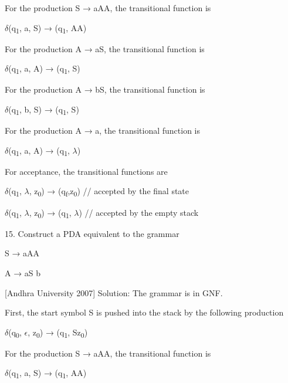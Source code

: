 \documentclass[]{article}
\begin{document}
For the production  S → aAA, the transitional function is

\begin{center}
	$\delta$(q\textsubscript{1}, a, S) → (q\textsubscript{1}, AA)
\end{center}

For the production   A → aS, the transitional function is

\begin{center}
	$\delta$(q\textsubscript{1}, a, A) → (q\textsubscript{1}, S)
\end{center}

For the production  A → bS, the transitional function is
\begin{center}
	$\delta$(q\textsubscript{1}, b, S) → (q\textsubscript{1}, S)
\end{center}

For the production  A → a, the transitional function is
\begin{center}
	$\delta$(q\textsubscript{1}, a, A) → (q\textsubscript{1}, $\lambda$)
\end{center}

For acceptance, the transitional functions are
\begin{center}
	$\delta$(q\textsubscript{1}, $\lambda$, z\textsubscript{0}) → (q\textsubscript{f},z\textsubscript{0}) // accepted by the final state
\end{center}

\begin{center}
	$\delta$(q\textsubscript{1}, $\lambda$, z\textsubscript{0}) → (q\textsubscript{1}, $\lambda$) // accepted by the empty stack
\end{center}



15. Construct a PDA equivalent to the grammar
\begin{center}
	S → aAA
\end{center}
\begin{center}
	A → aS \textbar{} b
\end{center}
[Andhra University 2007]
\newline
Solution: The grammar is in GNF.

First, the start symbol S is pushed into the stack by the following production
\begin{center}
	 $\delta$(q\textsubscript{0}, $\epsilon$, z\textsubscript{0}) → (q\textsubscript{1}, Sz\textsubscript{0})
\end{center}

For the production S → aAA, the transitional function is
\begin{center}
	$\delta$(q\textsubscript{1}, a, S) → (q\textsubscript{1}, AA)
\end{center}
\end{document}
